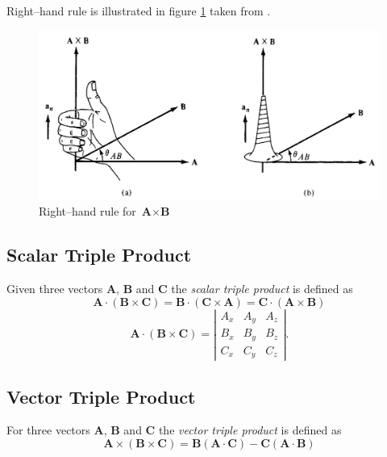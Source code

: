 \documentclass[12pt,a4paper]{article}
\begin{document}
Right--hand rule is illustrated in figure \ref{Right-hand-rule} taken from \cite[Figure 1.8, page 14]{Sadiku}.
\begin{figure}[H]
\includegraphics[scale=0.45]{Figure1-8S.png}
\caption{Right--hand rule for $\textbf{A}\times \textbf{B}$ \cite[Figure 1.8, page 14]{Sadiku}}
\label{Right-hand-rule}
\end{figure}
\subsection{Scalar Triple Product}
Given three vectors \textbf{A}, \textbf{B} and \textbf{C} the \textit{scalar triple product} is defined as
\begin{equation}
\textbf{A}\cdot (\textbf{B}\times \textbf{C})=\textbf{B}\cdot (\textbf{C}\times \textbf{A})=\textbf{C}\cdot (\textbf{A}\times \textbf{B})
\end{equation}
\begin{equation}
\textbf{A}\cdot (\textbf{B}\times \textbf{C})=\left| \begin{array}{ccc} A_x & A_y & A_z\\ B_x & B_y & B_z\\ C_x & C_y & C_z \end{array} \right|.
\end{equation}
\subsection{Vector Triple Product}
For three vectors \textbf{A}, \textbf{B} and \textbf{C} the \textit{vector triple product} is defined as
\begin{equation}
\textbf{A}\times (\textbf{B}\times \textbf{C})=\textbf{B}(\textbf{A}\cdot \textbf{C})-\textbf{C} (\textbf{A}\cdot \textbf{B})
\end{equation}
\end{document}
